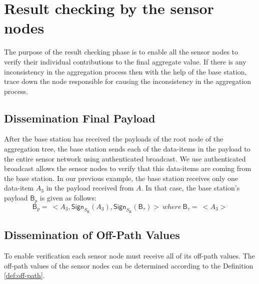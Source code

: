 \section{Result checking by the sensor nodes}
	The purpose of the result checking phase is to enable all the sensor nodes to verify their individual contributions to the final aggregate value.
	If there is any inconsistency in the aggregation process then with the help of the base station, trace down the node responsible for causing the inconsistency in the aggregation process.

	\subsection{Dissemination Final Payload}
		After the base station has received the payloads of the root node of the aggregation tree, the base station sends each of the data-items in the payload to the entire sensor network using authenticated broadcast.
		We use authenticated broadcast allows the sensor nodes to verify that this data-items are coming from the base station.
		In our previous example, the base station receives only one data-item $A_{3}$ in the payload received from $A$.
		In that case, the base station's payload $\textsf{B}_{p}$ is given as follows:
 		\begin{equation}
			\textsf{B}_{p} =\ <A_{3}, \textsf{Sign}_{S_{\textsf{B}}}(A_{3}), \textsf{Sign}_{S_{\textsf{B}}}(\textsf{B}_{\tau})>\ where\ \textsf{B}_{\tau} =\ <A_{3}>
		\end{equation}

	\subsection{Dissemination of Off-Path Values}
		To enable verification each sensor node must receive all of its off-path values.
		The off-path values of the sensor nodes can be determined according to the Definition \ref{def:off-path}.
		
